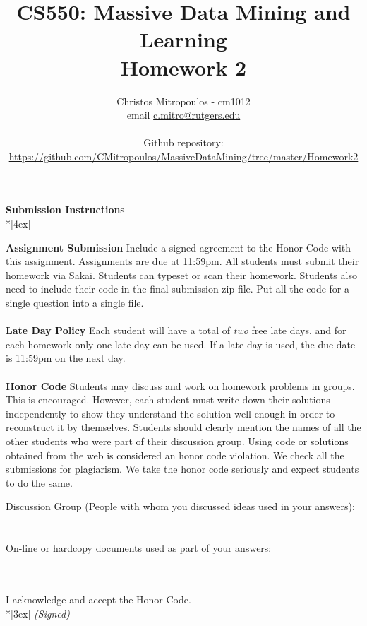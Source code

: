\documentclass[11pt]{article}
\title{\LARGE{\bf \textsf{CS550: Massive Data Mining and Learning}}\\ {\bf \textsf{Homework 2}}}
\author{Christos Mitropoulos - cm1012 \\ email \href{mailto:c.mitro@rutgers.edu}{c.mitro@rutgers.edu} \\\\ Github repository:\\ \href{https://github.com/CMitropoulos/MassiveDataMining/tree/master/Homework1}{https://github.com/CMitropoulos/MassiveDataMining/tree/master/Homework2}}
\date{}
\begin{document}
\begin{titlepage}
\maketitle
\end{titlepage}

\pagebreak[4]
\begin{center}
\LARGE{\bf \textsf{Submission Instructions}} \\*[4ex]
\end{center}

\textbf{Assignment Submission } Include a signed agreement to the Honor Code with this assignment. Assignments are due at 11:59pm. All students must submit their homework via Sakai. Students can typeset or scan their homework. Students also need to include their code in the final submission zip file. Put all the code for a single question into a single file. 
\\
\\
\textbf{Late Day Policy } Each student will have a total of {\em two} free late days, and for each homework only one late day can be used. If a late day is used, the due date is 11:59pm on the next day.
\\
\\
\textbf{Honor Code } Students may discuss and work on homework problems in groups. This is encouraged. However, each student must write down their solutions independently to show they understand the solution well enough in order to reconstruct it by themselves.  Students should clearly mention the names of all the other students who were part of their discussion group. Using code or solutions obtained from the web is considered an honor code violation. We check all the submissions for plagiarism. We take the honor code seriously and expect students to do the same. 

\vfill
\vfill

Discussion Group (People with whom you discussed ideas used in your answers): \\\\\\
On-line or hardcopy documents used as part of your answers: \\\\\\
\vfill

\vfill

I acknowledge and accept the Honor Code.\\*[3ex]
\bigskip
\textit{(Signed)}\hrulefill
\end{document}
